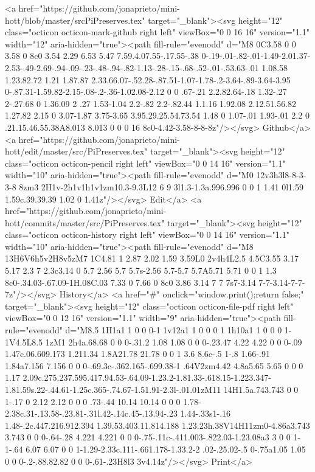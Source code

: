       <a href="https://github.com/jonaprieto/mini-hott/blob/master/srcPiPreserves.tex" target="_blank"><svg height="12" class="octicon octicon-mark-github right left" viewBox="0 0 16 16" version="1.1" width="12" aria-hidden="true"><path fill-rule="evenodd" d="M8 0C3.58 0 0 3.58 0 8c0 3.54 2.29 6.53 5.47 7.59.4.07.55-.17.55-.38 0-.19-.01-.82-.01-1.49-2.01.37-2.53-.49-2.69-.94-.09-.23-.48-.94-.82-1.13-.28-.15-.68-.52-.01-.53.63-.01 1.08.58 1.23.82.72 1.21 1.87.87 2.33.66.07-.52.28-.87.51-1.07-1.78-.2-3.64-.89-3.64-3.95 0-.87.31-1.59.82-2.15-.08-.2-.36-1.02.08-2.12 0 0 .67-.21 2.2.82.64-.18 1.32-.27 2-.27.68 0 1.36.09 2 .27 1.53-1.04 2.2-.82 2.2-.82.44 1.1.16 1.92.08 2.12.51.56.82 1.27.82 2.15 0 3.07-1.87 3.75-3.65 3.95.29.25.54.73.54 1.48 0 1.07-.01 1.93-.01 2.2 0 .21.15.46.55.38A8.013 8.013 0 0 0 16 8c0-4.42-3.58-8-8-8z"/></svg> Github</a>
      <a href="https://github.com/jonaprieto/mini-hott/edit/master/src/PiPreserves.tex" target="_blank"><svg height="12" class="octicon octicon-pencil right left" viewBox="0 0 14 16" version="1.1" width="10" aria-hidden="true"><path fill-rule="evenodd" d="M0 12v3h3l8-8-3-3-8 8zm3 2H1v-2h1v1h1v1zm10.3-9.3L12 6 9 3l1.3-1.3a.996.996 0 0 1 1.41 0l1.59 1.59c.39.39.39 1.02 0 1.41z"/></svg> Edit</a>
      <a href="https://github.com/jonaprieto/mini-hott/commits/master/src/PiPreserves.tex" target="_blank"><svg height="12" class="octicon octicon-history right left" viewBox="0 0 14 16" version="1.1" width="10" aria-hidden="true"><path fill-rule="evenodd" d="M8 13H6V6h5v2H8v5zM7 1C4.81 1 2.87 2.02 1.59 3.59L0 2v4h4L2.5 4.5C3.55 3.17 5.17 2.3 7 2.3c3.14 0 5.7 2.56 5.7 5.7s-2.56 5.7-5.7 5.7A5.71 5.71 0 0 1 1.3 8c0-.34.03-.67.09-1H.08C.03 7.33 0 7.66 0 8c0 3.86 3.14 7 7 7s7-3.14 7-7-3.14-7-7-7z"/></svg> History</a>
      <a  href="#" onclick="window.print();return false;" target="_blank"><svg height="12" class="octicon octicon-file-pdf right left" viewBox="0 0 12 16" version="1.1" width="9" aria-hidden="true"><path fill-rule="evenodd" d="M8.5 1H1a1 1 0 0 0-1 1v12a1 1 0 0 0 1 1h10a1 1 0 0 0 1-1V4.5L8.5 1zM1 2h4a.68.68 0 0 0-.31.2 1.08 1.08 0 0 0-.23.47 4.22 4.22 0 0 0-.09 1.47c.06.609.173 1.211.34 1.8A21.78 21.78 0 0 1 3.6 8.6c-.5 1-.8 1.66-.91 1.84a7.156 7.156 0 0 0-.69.3c-.362.165-.699.38-1 .64V2zm4.42 4.8a5.65 5.65 0 0 0 1.17 2.09c.275.237.595.417.94.53-.64.09-1.23.2-1.81.33-.618.15-1.223.347-1.81.59s.22-.44.61-1.25c.365-.74.67-1.51.91-2.3l-.01.01zM11 14H1.5a.743.743 0 0 1-.17 0 2.12 2.12 0 0 0 .73-.44 10.14 10.14 0 0 0 1.78-2.38c.31-.13.58-.23.81-.31l.42-.14c.45-.13.94-.23 1.44-.33s1-.16 1.48-.2c.447.216.912.394 1.39.53.403.11.814.188 1.23.23h.38V14H11zm0-4.86a3.743 3.743 0 0 0-.64-.28 4.221 4.221 0 0 0-.75-.11c-.411.003-.822.03-1.23.08a3 3 0 0 1-1-.64 6.07 6.07 0 0 1-1.29-2.33c.111-.661.178-1.33.2-2 .02-.25.02-.5 0-.75a1.05 1.05 0 0 0-.2-.88.82.82 0 0 0-.61-.23H8l3 3v4.14z"/></svg> Print</a>
